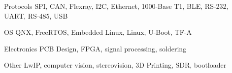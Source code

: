 


\begin{cvskills}


\cvskill
{Protocols} %
{SPI, CAN, Flexray, I2C, Ethernet, 1000-Base T1, BLE, RS-232, UART, RS-485, USB} %


\cvskill
{OS} %
{QNX, FreeRTOS, Embedded Linux, Linux, U-Boot, TF-A} %


\cvskill
{Electronics} %
{PCB Design, FPGA, signal processing, soldering} %


\cvskill
{Other} %
{LwIP, computer vision, stereovision, 3D Printing, SDR, bootloader} %


\end{cvskills}